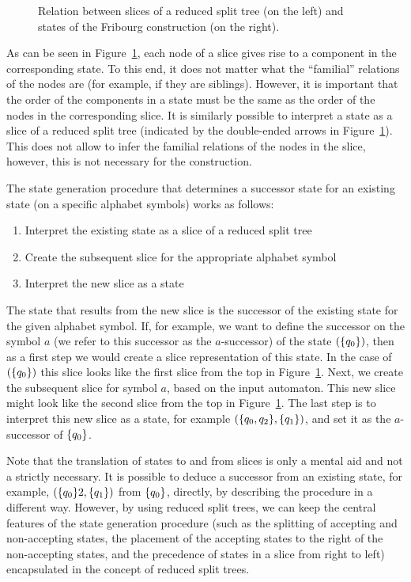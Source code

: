\begin{figure}[htb]
\centering
\Slices
\caption{Relation between slices of a reduced split tree (on the left) and states of the Fribourg construction (on the right).}
\label{slices}
\end{figure}

As can be seen in Figure~\ref{slices}, each node of a slice gives rise to a component in the corresponding state. To this end, it does not matter what the ``familial'' relations of the nodes are (for example, if they are siblings). However, it is important that the order of the components in a state must be the same as the order of the nodes in the corresponding slice. It is similarly possible to interpret a state as a slice of a reduced split tree (indicated by the double-ended arrows in Figure~\ref{slices}). This does not allow to infer the familial relations of the nodes in the slice, however, this is not necessary for the construction.

The state generation procedure that determines a successor state for an existing state (on a specific alphabet symbols) works as follows:
\begin{enumerate}
\item Interpret the existing state as a slice of a reduced split tree
\item Create the subsequent slice for the appropriate alphabet symbol
\item Interpret the new slice as a state
\end{enumerate}
The state that results from the new slice is the successor of the existing state for the given alphabet symbol. If, for example, we want to define the successor on the symbol $a$ (we refer to this successor as the $a$-successor) of the state $(\{q_{0}\})$, then as a first step we would create a slice representation of this state. In the case of $(\{q_{0}\})$ this slice looks like the first slice from the top in Figure~\ref{slices}. Next, we create the subsequent slice for symbol $a$, based on the input automaton. This new slice might look like the second slice from the top in Figure~\ref{slices}. The last step is to interpret this new slice as a state, for example $(\{q_{0},q_{2}\}, \{q_{1}\})$, and set it as the $a$-successor of $\{q_{0}\}$.

Note that the translation of states to and from slices is only a mental aid and not a strictly necessary. It is possible to deduce a successor from an existing state, for example, $(\{q_{0}\}2,\{q_{1}\})$ from $\{q_{0}\}$, directly, by describing the procedure in a different way. However, by using reduced split trees, we can keep the central features of the state generation procedure (such as the splitting of accepting and non-accepting states, the placement of the accepting states to the right of the non-accepting states, and the precedence of states in a slice from right to left) encapsulated in the concept of reduced split trees.

